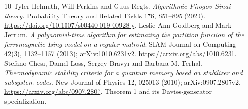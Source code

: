 \documentclass[11pt,a4paper]{article}
\begin{document}
\begin{thebibliography}{10}
 Tyler Helmuth, Will Perkins and Guus Regts. \emph{Algorithmic Pirogov--Sinai theory}. Probability Theory and Related Fields 176, 851--895 (2020). \url{https://doi.org/10.1007/s00440-019-00928-y}.
 Leslie Ann Goldberg and Mark Jerrum. \emph{A polynomial-time algorithm for estimating the partition function of the ferromagnetic Ising model on a regular matroid}. SIAM Journal on Computing 42(3), 1132--1157 (2013); arXiv:1010.6231v2. \url{https://arxiv.org/abs/1010.6231}.
 Stefano Chesi, Daniel Loss, Sergey Bravyi and Barbara M. Terhal. \emph{Thermodynamic stability criteria for a quantum memory based on stabilizer and subsystem codes}. New Journal of Physics 12, 025013 (2010); arXiv:0907.2807v2. \url{https://arxiv.org/abs/0907.2807}. Theorem 1 and its Davies-generator specialization.
\end{thebibliography}
\end{document}

